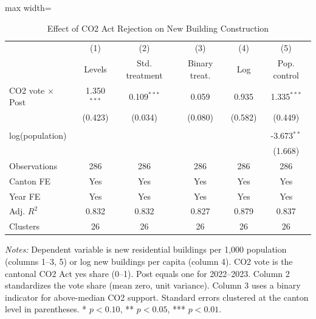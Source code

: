 \begin{table}[H]
\centering
\caption{Effect of CO2 Act Rejection on New Building Construction}
\begin{threeparttable}
\begin{adjustbox}{max width=\textwidth}
\begin{tabular}{lccccc}
\toprule
& (1) & (2) & (3) & (4) & (5) \\
& Levels & Std. treatment & Binary treat. & Log & Pop. control \\
\midrule
CO2 vote $\times$ Post & 1.350$^{***}$ & 0.109$^{***}$ & 0.059 & 0.935 & 1.335$^{***}$ \\
& (0.423) & (0.034) & (0.080) & (0.582) & (0.449) \\
\\
log(population) & & & & & -3.673$^{**}$ \\
& & & & & (1.668) \\
\midrule
Observations & 286 & 286 & 286 & 286 & 286 \\
Canton FE & Yes & Yes & Yes & Yes & Yes \\
Year FE & Yes & Yes & Yes & Yes & Yes \\
Adj. $R^2$ & 0.832 & 0.832 & 0.827 & 0.879 & 0.837 \\
Clusters & 26 & 26 & 26 & 26 & 26 \\
\bottomrule
\end{tabular}
\end{adjustbox}
\begin{tablenotes}[flushleft]
\small
\item \textit{Notes:} Dependent variable is new residential buildings per 1,000 population (columns 1--3, 5) or log new buildings per capita (column 4). CO2 vote is the cantonal CO2 Act yes share (0--1). Post equals one for 2022--2023. Column 2 standardizes the vote share (mean zero, unit variance). Column 3 uses a binary indicator for above-median CO2 support. Standard errors clustered at the canton level in parentheses. * $p<0.10$, ** $p<0.05$, *** $p<0.01$.
\end{tablenotes}
\end{threeparttable}
\label{tab:main}
\end{table}
